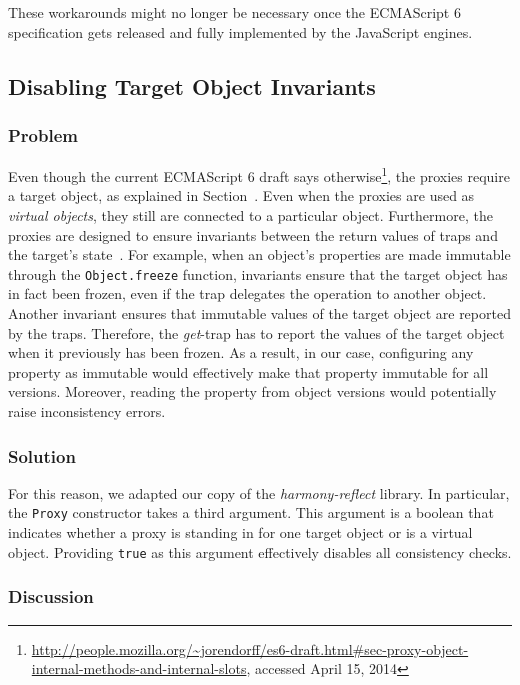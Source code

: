 These workarounds might no longer be necessary once the ECMAScript 6 specification gets released and fully implemented by the JavaScript engines. 


\subsection{Disabling Target Object Invariants}

\subsubsection{Problem}
Even though the current ECMAScript 6 draft says otherwise\footnote{\url{http://people.mozilla.org/~jorendorff/es6-draft.html\#sec-proxy-object-internal-methods-and-internal-slots}, accessed April 15, 2014}, the proxies require a target object, as explained in Section~\label{subsec:IMPLEMENTATION:1.1}.
Even when the proxies are used as \emph{virtual objects}, they still are connected to a particular object.
Furthermore, the proxies are designed to ensure invariants between the return values of traps and the target's state~\cite{Cutsem2013TRP}.
For example, when an object's properties are made immutable through the \lstinline{Object.freeze} function, invariants ensure that the target object has in fact been frozen, even if the trap delegates the operation to another object.
Another invariant ensures that immutable values of the target object are reported by the traps.
Therefore, the \emph{get}-trap has to report the values of the target object when it previously has been frozen.
As a result, in our case, configuring any property as immutable would effectively make that property immutable for all versions.
Moreover, reading the property from object versions would potentially raise inconsistency errors.

\subsubsection{Solution}
For this reason, we adapted our copy of the \emph{harmony-reflect} library.
In particular, the \lstinline{Proxy} constructor takes a third argument.
This argument is a boolean that indicates whether a proxy is standing in for one target object or is a virtual object.
Providing \lstinline{true} as this argument effectively disables all consistency checks.


\subsubsection{Discussion}

